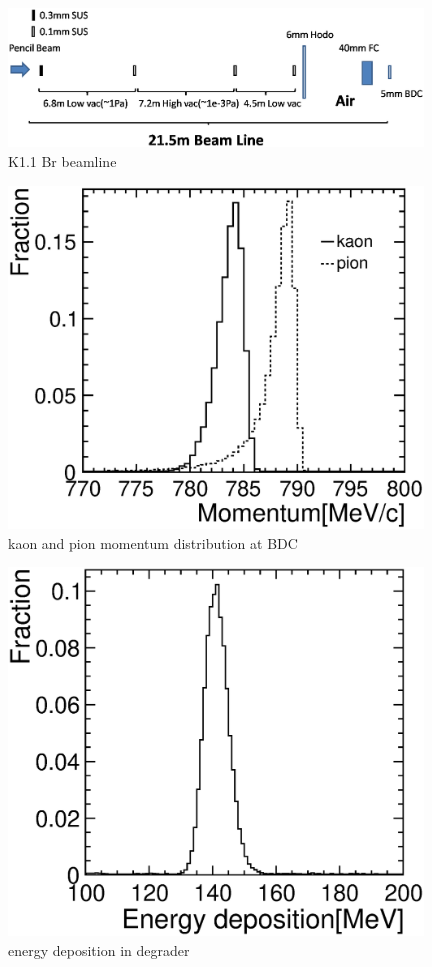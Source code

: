    \begin{figure}[!htb]
    \centering
    \centering
    \includegraphics[width=11cm,clip]{./fig/K11Br_beamline_sim.eps}
    \caption{K1.1 Br beamline}
    \label{K11Br_Beam_line}
   \end{figure}



   \begin{figure}[!htb]
    \centering
    \centering
    \includegraphics[width=11cm,clip]{./fig/Kaon_pion_momentum_nogrid.eps}
    \caption{kaon and pion momentum distribution at BDC}
    \label{k_pi_momentum}
   \end{figure}


   \begin{figure}[!htb]
    \centering
    \centering
    \includegraphics[width=11cm,clip]{./fig/energy_deposition.eps}
    \caption{energy deposition in degrader}
    \label{energy_deposition}
   \end{figure}


